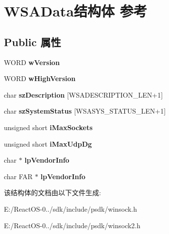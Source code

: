 \hypertarget{struct_w_s_a_data}{}\section{W\+S\+A\+Data结构体 参考}
\label{struct_w_s_a_data}
\subsection*{Public 属性}
\begin{DoxyCompactItemize}
\item 
\mbox{\label{struct_w_s_a_data_acedc22f14e73bf97545feb47197fac07}} 
W\+O\+RD {\bfseries w\+Version}
\item 
\mbox{\label{struct_w_s_a_data_ad0e052b518c51d34ee2f4ced7242bcc5}} 
W\+O\+RD {\bfseries w\+High\+Version}
\item 
\mbox{\label{struct_w_s_a_data_a092240fb9569e3418cc8566b13cc907f}} 
char {\bfseries sz\+Description} \mbox{[}W\+S\+A\+D\+E\+S\+C\+R\+I\+P\+T\+I\+O\+N\+\_\+\+L\+EN+1\mbox{]}
\item 
\mbox{\label{struct_w_s_a_data_ab2476de1ccfa6a2f5db005429964724e}} 
char {\bfseries sz\+System\+Status} \mbox{[}W\+S\+A\+S\+Y\+S\+\_\+\+S\+T\+A\+T\+U\+S\+\_\+\+L\+EN+1\mbox{]}
\item 
\mbox{\label{struct_w_s_a_data_ae82e2b03e3e6432e4f3cef65a0a1ae0a}} 
unsigned short {\bfseries i\+Max\+Sockets}
\item 
\mbox{\label{struct_w_s_a_data_a1c935dc88a61da1e8b894df11a275d39}} 
unsigned short {\bfseries i\+Max\+Udp\+Dg}
\item 
\mbox{\label{struct_w_s_a_data_a3ec75d01d94a76253dd4047f20b9ef51}} 
char $\ast$ {\bfseries lp\+Vendor\+Info}
\item 
\mbox{\label{struct_w_s_a_data_a99abdf03bcc5adf63a5cffe684ec9f85}} 
char F\+AR $\ast$ {\bfseries lp\+Vendor\+Info}
\end{DoxyCompactItemize}


该结构体的文档由以下文件生成\+:\begin{DoxyCompactItemize}
\item 
E\+:/\+React\+O\+S-\/0../sdk/include/psdk/winsock.\+h\item 
E\+:/\+React\+O\+S-\/0../sdk/include/psdk/winsock2.\+h\end{DoxyCompactItemize}
